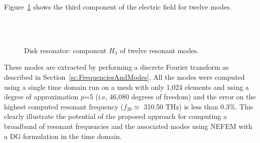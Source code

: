 Figure~\ref{fig:circle2DfreeSpace_modes} shows the third component of the electric field for twelve modes. 
\begin{figure}[!ht]
\centering
{}
 \\
%
 \\
%
\caption{Disk resonator: component $H_3$ of twelve resonant modes.}
\label{fig:circle2DfreeSpace_modes}
\end{figure}
These modes are extracted by performing a discrete Fourier transform as described in Section~\ref{sc:FrequenciesAndModes}. All the modes were computed using a single time domain run on a mesh with 
only 1,024 elements and using a degree of approximation $p$=5 (i.e, 46,080 degrees of freedom) and the error on the highest computed resonant frequency ($f_{20} \approx$ 310.50 THz) is less than 0.3\%. This clearly illustrate the potential of the proposed approach for computing a broadband of resonant frequencies and the associated modes using NEFEM with a DG formulation in the time domain.

